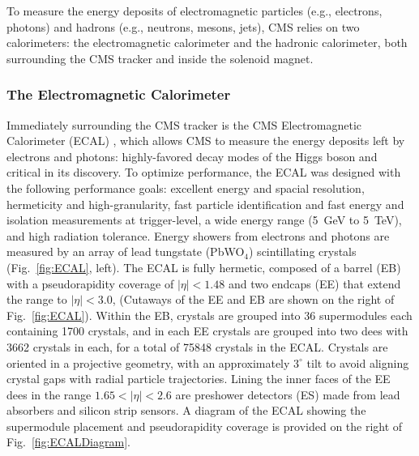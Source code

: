 To measure the energy deposits of electromagnetic particles (e.g., electrons, photons) and hadrons (e.g., neutrons, mesons, jets), CMS relies on two calorimeters: the electromagnetic calorimeter and the hadronic calorimeter, both surrounding the CMS tracker and inside the solenoid magnet.

\subsubsection{The Electromagnetic Calorimeter} \label{sec:ECAL}
Immediately surrounding the CMS tracker is the CMS Electromagnetic Calorimeter (ECAL) \cite{ECALTDR}, which allows CMS to measure the energy deposits left by electrons and photons: highly-favored decay modes of the Higgs boson and critical in its discovery. To optimize performance, the ECAL was designed with the following performance goals: excellent energy and spacial resolution, hermeticity and high-granularity, fast particle identification and fast energy and isolation measurements at trigger-level, a wide energy range (\SI{5}{GeV} to \SI{5}{TeV}), and high radiation tolerance. Energy showers from electrons and photons are measured by an array of lead tungstate (PbWO$_4$) scintillating crystals (Fig.~\ref{fig:ECAL}, left). The ECAL is fully hermetic, composed of a barrel (EB) with a pseudorapidity coverage of $|\eta|<1.48$ and two endcaps (EE) that extend the range to $|\eta|<3.0$, (Cutaways of the EE and EB are shown on the right of Fig.~\ref{fig:ECAL}). Within the EB, crystals are grouped into 36 supermodules each containing 1700 crystals, and in each EE crystals are grouped into two dees with 3662 crystals in each, for a total of 75848 crystals in the ECAL. Crystals are oriented in a projective geometry, with an approximately $3^{\circ}$ tilt to avoid aligning crystal gaps with radial particle trajectories. Lining the inner faces of the EE dees in the range $1.65<|\eta|<2.6$ are preshower detectors (ES) made from lead absorbers and silicon strip sensors. A diagram of the ECAL showing the supermodule placement and pseudorapidity coverage is provided on the right of Fig.~\ref{fig:ECALDiagram}.

